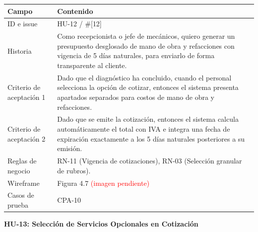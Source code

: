 {\def\LTcaptype{none} %
\begin{longtable}[]{@{}
  >{\raggedright\arraybackslash}p{}
  >{\raggedright\arraybackslash}p{}@{}}
\toprule\noalign{}
\begin{minipage}[b]{\linewidth}\raggedright
\textbf{Campo}
\end{minipage} & \begin{minipage}[b]{\linewidth}\raggedright
\textbf{Contenido}
\end{minipage} \\
\midrule\noalign{}
\endhead
\bottomrule\noalign{}
\endlastfoot
ID e issue & HU-12 / \#{[}12{]} \\
Historia & Como recepcionista o jefe de mecánicos, quiero generar un
presupuesto desglosado de mano de obra y refacciones con vigencia de 5
días naturales, para enviarlo de forma transparente al cliente. \\
Criterio de aceptación 1 & Dado que el diagnóstico ha concluido, cuando
el personal selecciona la opción de cotizar, entonces el sistema
presenta apartados separados para costos de mano de obra y
refacciones. \\
Criterio de aceptación 2 & Dado que se emite la cotización, entonces el
sistema calcula automáticamente el total con IVA e integra una fecha de
expiración exactamente a los 5 días naturales posteriores a su
emisión. \\
Reglas de negocio & RN-11 (Vigencia de cotizaciones), RN-03 (Selección
granular de rubros). \\
Wireframe & Figura 4.7 \textcolor{red}{(imagen pendiente)} \\
Casos de prueba & CPA-10 \\
\end{longtable}
}

\textbf{HU-13: Selección de Servicios Opcionales en Cotización}

